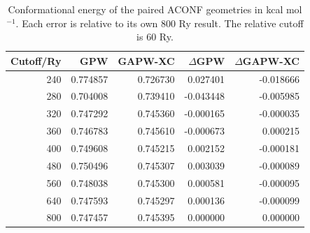 \begin{table}[htbp]
\centering\small
\caption{Conformational energy of the paired ACONF geometries in kcal mol$^{-1}$. Each error is relative to its own 800 Ry result. The relative cutoff is 60 Ry.}
\begin{tabular}{rrrrr}
\toprule
Cutoff/Ry & GPW & GAPW-XC & $\Delta$GPW & $\Delta$GAPW-XC\\
\midrule
240 & 0.774857 & 0.726730 & 0.027401 & -0.018666 \\
280 & 0.704008 & 0.739410 & -0.043448 & -0.005985 \\
320 & 0.747292 & 0.745360 & -0.000165 & -0.000035 \\
360 & 0.746783 & 0.745610 & -0.000673 & 0.000215 \\
400 & 0.749608 & 0.745215 & 0.002152 & -0.000181 \\
480 & 0.750496 & 0.745307 & 0.003039 & -0.000089 \\
560 & 0.748038 & 0.745300 & 0.000581 & -0.000095 \\
640 & 0.747593 & 0.745297 & 0.000136 & -0.000099 \\
800 & 0.747457 & 0.745395 & 0.000000 & 0.000000 \\
\bottomrule
\end{tabular}
\end{table}
